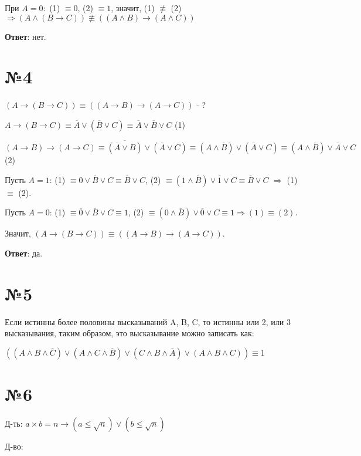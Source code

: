 \documentclass[a4paper,16pt]{article}
\begin{document}
	При $A = 0:$ (1) $\equiv 0$, (2) $\equiv 1$, значит, (1) $\not \equiv$ (2) $ \Rightarrow (A \land (B \to C)) \not \equiv ((A \land B) \to (A \land C)) $
	
	\textbf{Ответ}: нет.
	
	\section*{№4}
	
		$(A \to (B \to C)) \equiv ((A \to B) \to (A \to C)) $ - ?
		
		$A \to (B \to C) \equiv \overline{A} \lor (\overline{B} \lor C)  \equiv \overline{A} \lor \overline{B} \lor C$ (1)
		
		$(A \to B) \to (A \to C) \equiv  \overline{(\overline{A} \lor B)} \lor (\overline{A} \lor C) \equiv (A \land \overline{B}) \lor (\overline{A} \lor C) \equiv (A \land \overline{B}) \lor \overline{A} \lor C$ (2)
		
		Пусть $A = 1$: (1) $\equiv 0 \lor \overline{B} \lor C \equiv \overline{B} \lor C$, (2)
		$\equiv (1 \land \overline{B}) \lor \overline{1} \lor C \equiv \overline{B} \lor C$ $\Rightarrow$ (1) $\equiv$ (2).
		
		Пусть $A = 0$: (1) $\equiv \overline{0} \lor \overline{B} \lor C \equiv 1$, (2) $\equiv
		(0 \land \overline{B}) \lor \overline{0} \lor C \equiv 1 \Rightarrow (1) \equiv (2)$.
		
		Значит, $(A \to (B \to C)) \equiv ((A \to B) \to (A \to C)) $.
		
		\textbf{Ответ}: да.
		
		\section*{№5}
		
		Если истинны более половины высказываний A, B, C, то истинны или 2, или 3 высказывания, таким образом, это высказывание можно записать как:
		
		$((A\land B \land \overline{C}) \lor  (A\land C \land \overline{B}) \lor (C\land B \land \overline{A}) \lor (A\land B \land C)) \equiv 1$
		
		\section*{№6}
		
		Д-ть: $a \times b = n \to (a \leq \sqrt{n}) \lor (b \leq \sqrt{n}) $
		
		Д-во:
		
\end{document}
